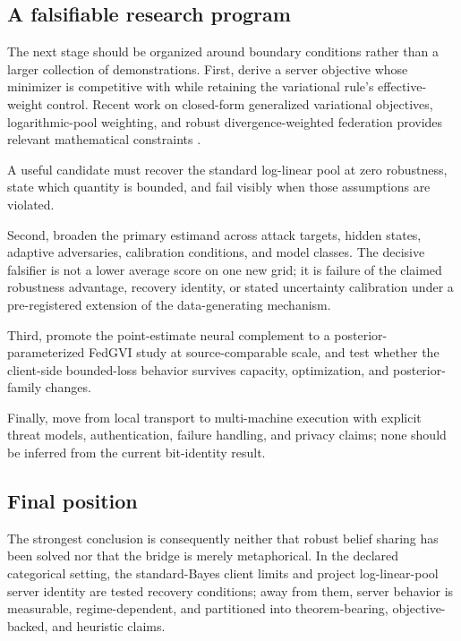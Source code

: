 \documentclass[
  english,
]{article}
\newcounter{none} %
\theoremstyle{plain}
\theoremstyle{definition}
\theoremstyle{remark}
\theoremstyle{definition}
\begin{document}
\subsection{A falsifiable research
program}\label{sec:conclusion-program}

The next stage should be organized around boundary conditions rather
than a larger collection of demonstrations. First, derive a server
objective whose minimizer is competitive with 
while retaining the variational rule's effective-weight control. Recent
work on closed-form generalized variational objectives, logarithmic-pool
weighting, and robust divergence-weighted federation provides relevant
mathematical constraints
\citep{nguyen2026closedformgvi, carvalho2023logpooling, li2022gammafl}.

A useful candidate must recover the standard log-linear pool at zero
robustness, state which quantity is bounded, and fail visibly when those
assumptions are violated.

Second, broaden the primary estimand across attack targets, hidden
states, adaptive adversaries, calibration conditions, and model classes.
The decisive falsifier is not a lower average score on one new grid; it
is failure of the claimed robustness advantage, recovery identity, or
stated uncertainty calibration under a pre-registered extension of the
data-generating mechanism.

Third, promote the point-estimate neural complement to a
posterior-parameterized FedGVI study at source-comparable scale, and
test whether the client-side bounded-loss behavior survives capacity,
optimization, and posterior-family changes.

Finally, move from local transport to multi-machine execution with
explicit threat models, authentication, failure handling, and privacy
claims; none should be inferred from the current bit-identity result.

\subsection{Final position}\label{sec:conclusion-position}

The strongest conclusion is consequently neither that robust belief
sharing has been solved nor that the bridge is merely metaphorical. In
the declared categorical setting, the standard-Bayes client limits and
project log-linear-pool server identity are tested recovery conditions;
away from them, server behavior is measurable, regime-dependent, and
partitioned into theorem-bearing, objective-backed, and heuristic
claims.
\end{document}
